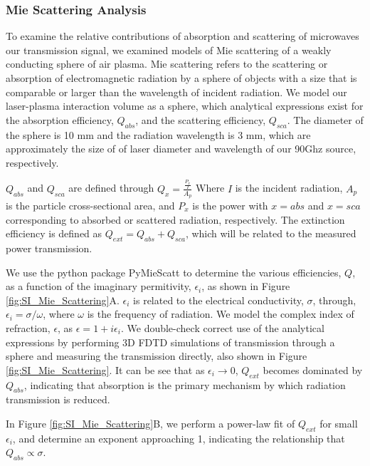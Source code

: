 \subsubsection{Mie Scattering Analysis}

To examine the relative contributions of absorption and scattering of microwaves our transmission signal, we examined models of Mie scattering of a weakly conducting sphere of air plasma. Mie scattering refers to the scattering or absorption of electromagnetic radiation by a sphere of objects with a size that is comparable or larger than the wavelength of incident radiation.\cite{bohrenAbsorptionScatteringLight2007} We model our laser-plasma interaction volume as a sphere, which analytical expressions exist for the absorption efficiency, $Q_{abs}$, and the scattering efficiency, $Q_{sca}$. The diameter of the sphere is 10 mm and the radiation wavelength is 3 mm, which are approximately the size of of laser diameter and wavelength of our 90Ghz source, respectively. 

$Q_{abs}$ and $Q_{sca}$ are defined through $Q_x = \frac{\frac{P_x}{I}}{A_p}$ Where $I$ is the incident radiation, $A_p$ is the particle cross-sectional area, and $P_x$ is the power with $x=abs$ and $x=sca$ corresponding to absorbed or scattered radiation, respectively.\cite{bohrenAbsorptionScatteringLight2007}  The extinction efficiency is defined as $Q_{ext} = Q_{abs} + Q_{sca}$, which will be related to the measured power transmission. 

We use the python package PyMieScatt to determine the various efficiencies, $Q$, as a function of the imaginary permitivity, $\epsilon_i$, as shown in Figure \ref{fig:SI_Mie_Scattering}A. $\epsilon_i$ is related to the electrical conductivity, $\sigma$, through, $\epsilon_i = \sigma/\omega$, where $\omega$ is the frequency of radiation.\cite{coltonComplexWaveNumber2021}  We model the complex index of refraction, $\epsilon$, as $\epsilon = 1 + i\epsilon_i$. We double-check correct use of the analytical expressions by performing 3D FDTD simulations of transmission through a sphere and measuring the transmission directly, also shown in Figure \ref{fig:SI_Mie_Scattering}. It can be see that as $\epsilon_i \rightarrow 0$, $Q_{ext}$ becomes dominated by $Q_{abs}$, indicating that absorption is the primary mechanism by which radiation transmission is reduced.

In Figure \ref{fig:SI_Mie_Scattering}B, we perform a power-law fit of $Q_{ext}$ for small $\epsilon_i$, and determine an exponent approaching 1, indicating the relationship that $Q_{abs} \propto \sigma$. 


